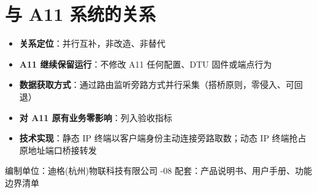 \documentclass[11pt,a4paper]{ctexart}
\begin{document}
\section{与 A11 系统的关系}

\begin{itemize}[leftmargin=*]
  \item \textbf{关系定位}：并行互补，非改造、非替代
  \item \textbf{A11 继续保留运行}：不修改 A11 任何配置、DTU 固件或端点行为
  \item \textbf{数据获取方式}：通过路由监听旁路方式并行采集（搭桥原则，零侵入、可回退）
  \item \textbf{对 A11 原有业务零影响}：列入验收指标
  \item \textbf{技术实现}：静态 IP 终端以客户端身份主动连接旁路取数；动态 IP 终端抢占原地址端口桥接转发
\end{itemize}

\vspace{1em}\noindent\hrulefill
\begin{center}\small
编制单位：迪格(杭州)物联科技有限公司 -08 \quad 配套：产品说明书、用户手册、功能边界清单
\end{center}
\end{document}

